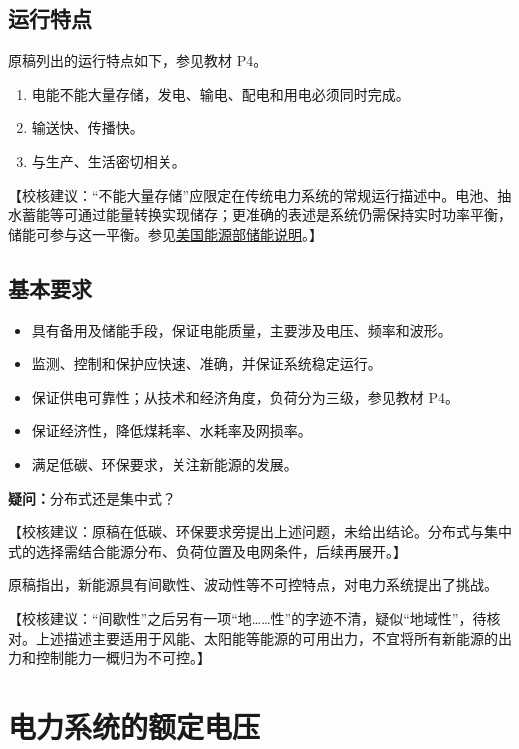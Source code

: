 \documentclass[
  12pt,
  UTF8,
  a4paper,
  fontset=fandol,
  oneside,
  openany
]{ctexrep}
\newcommand{\reviewnote}[1]{%
  \par\smallskip
  {\color{reviewgray}\small\noindent【校核建议：#1】\par}
  \smallskip
}
\begin{document}
\subsection{运行特点}

原稿列出的运行特点如下，参见教材 P4。

\begin{enumerate}
  \item 电能不能大量存储，发电、输电、配电和用电必须同时完成。
  \item 输送快、传播快。
  \item 与生产、生活密切相关。
\end{enumerate}

\reviewnote{“不能大量存储”应限定在传统电力系统的常规运行描述中。电池、抽水蓄能等可通过能量转换实现储存；更准确的表述是系统仍需保持实时功率平衡，储能可参与这一平衡。参见\href{https://www.energy.gov/energy-storage}{美国能源部储能说明}。}

\subsection{基本要求}

\begin{itemize}
  \item 具有备用及储能手段，保证电能质量，主要涉及电压、频率和波形。
  \item 监测、控制和保护应快速、准确，并保证系统稳定运行。
  \item 保证供电可靠性；从技术和经济角度，负荷分为三级，参见教材 P4。
  \item 保证经济性，降低煤耗率、水耗率及网损率。
  \item 满足低碳、环保要求，关注新能源的发展。
\end{itemize}

\textbf{疑问：}分布式还是集中式？

\reviewnote{原稿在低碳、环保要求旁提出上述问题，未给出结论。分布式与集中式的选择需结合能源分布、负荷位置及电网条件，后续再展开。}

原稿指出，新能源具有间歇性、波动性等不可控特点，对电力系统提出了挑战。

\reviewnote{“间歇性”之后另有一项“地……性”的字迹不清，疑似“地域性”，待核对。上述描述主要适用于风能、太阳能等能源的可用出力，不宜将所有新能源的出力和控制能力一概归为不可控。}

\section{电力系统的额定电压}
\end{document}
